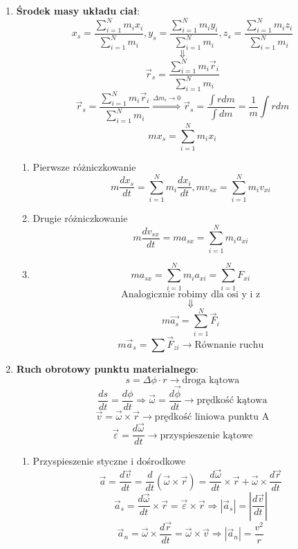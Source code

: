 \documentclass{article}
\begin{document}
\begin{enumerate}
		\item \textbf{Środek masy układu ciał}:
		\[
		x_s = \frac{\sum\limits_{i = 1}^N m_ix_i}{\sum\limits_{i = 1}^N m_i},
		y_s = \frac{\sum\limits_{i = 1}^N m_iy_i}{\sum\limits_{i = 1}^N m_i},
		z_s = \frac{\sum\limits_{i = 1}^N m_iz_i}{\sum\limits_{i = 1}^N m_i}
		\]
		\[
		\Downarrow
		\]
		\[
		\vec{r}_s = \frac{\sum\limits_{i = 1}^N m_i \vec{r}_i}{\sum\limits_{i = 1}^N m_i}
		\]
		\[
		\vec{r}_s = \frac{\sum\limits_{i = 1}^N m_i \vec{r}_i}{\sum\limits_{i = 1}^N m_i}
		\overset{\Delta m_i \rightarrow 0}{\Rightarrow}
		 \vec{r}_s = \frac{\int rdm}{\int dm} =
		\frac{1}{m} \int rdm
		\]
		\[
		mx_s = \sum\limits_{i = 1}^N m_i x_i
		\]
		\begin{enumerate}
			\item Pierwsze różniczkowanie
			\[
			m \frac{dx_s}{dt} = \sum\limits_{i = 1}^N m_i \frac{dx_i}{dt},
			mv_{sx} = \sum\limits_{i = 1}^N m_i v_{xi}
			\]
			\item Drugie różniczkowanie
			\[
			m \frac{dv_{sx}}{dt} = ma_{sx} = \sum\limits_{i = 1}^N m_i a_{xi}
			\]
			\item {}
			\[
			ma_{sx} = \sum\limits_{i = 1}^N m_i a_{xi} = \sum\limits_{i = 1}^N F_{xi}
			\]
			\[
			\text{Analogicznie robimy dla osi y i z}
			\]
			\[
			\Downarrow
			\]
			\[
			m \overrightarrow{a_s} = \sum\limits_{i = 1}^N \vec{F}_i
			\]
			\[
			m \vec{a}_s = \sum\vec{F}_{zi} \longrightarrow \text{Równanie ruchu}
			\]
		\end{enumerate}
		
		
		\item \textbf{Ruch obrotowy punktu materialnego}:
		\[
		s = \Delta\phi \cdot r \longrightarrow \text{droga kątowa}
		\]
		\[
		\frac{ds}{dt} = \frac{d \phi}{dt}
		\Rightarrow
		\vec{\omega} = \frac{d \vec{\phi}}{dt} \longrightarrow \text{prędkość kątowa}
		\]
		\[
		\vec{v} = \vec{\omega} \times \vec{r} \longrightarrow \text{prędkość liniowa punktu A}
		\]
		\[
		\vec{\varepsilon} = \frac{d \vec{\omega}}{dt} \longrightarrow \text{przyspieszenie kątowe}
		\]
		\begin{enumerate}
			\item Przyspieszenie styczne i dośrodkowe
			\[
			\vec{a} = \frac{d \vec{v}}{dt} = \frac{d}{dt} (\vec{\omega} \times \vec{r}) =
			\frac{d \vec{\omega}}{dt} \times \vec{r} + \vec{\omega} \times \frac{d \vec{r}}{dt}
			\]
			\[
			\vec{a}_s = \frac{d \vec{\omega}}{dt} \times \vec{r} = \vec{\varepsilon} \times \vec{r} \Rightarrow | \vec{a}_s | = \left| \frac{d \vec{v}}{dt} \right|
			\]
			\[
			\vec{a}_n = \vec{\omega} \times \frac{d \vec{r}}{dt} = \vec{\omega} \times \vec{v} \Rightarrow | \vec{a}_n | = \frac{v^2}{r}
			\]
		\end{enumerate}
		

\end{enumerate}
\end{document}
